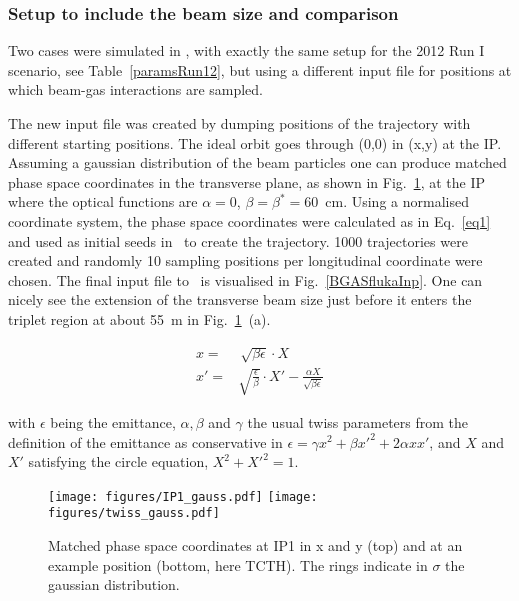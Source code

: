 \subsubsection{Setup to include the beam size and comparison \label{beamgasBS}}
Two cases were simulated in \fluka, with exactly the same setup for the 2012 Run I scenario, see Table~\ref{paramsRun12}, but using a different input file for positions at which beam-gas interactions are sampled.

The new input file was created by dumping positions of the trajectory with different starting positions. The ideal orbit goes through (0,0) in (x,y) at the IP. Assuming a gaussian distribution of the beam particles one can produce matched phase space coordinates in the transverse plane, as shown in Fig.~\ref{ip1_gauss}, at the IP where the optical functions are $\alpha = 0$, $\beta = \beta^* = 60$~cm. Using a normalised coordinate system, the phase space coordinates were calculated as in Eq.~\ref{eq1} and used as initial seeds in \fluka~to create the trajectory. 1000 trajectories were created and randomly 10 sampling positions per longitudinal coordinate were chosen. The final input file to \fluka~is visualised in Fig.~\ref{BGASflukaInp}. One can nicely see the extension of the transverse beam size just before it enters the triplet region at about 55~m in Fig.~\ref{ip1_gauss}~(a). 

\begin{equation} \label{eq1}
  \begin{split}
x = & \, \sqrt{\beta \epsilon} \cdot X \\
x' = & \sqrt{\frac{\epsilon}{\beta}} \cdot X' - \frac{\alpha X}{\sqrt{\beta \epsilon}}
  \end{split}
\end{equation}

with $\epsilon$ being the emittance, $\alpha, \beta$ and $\gamma$ the usual twiss parameters from the definition of the emittance as conservative in $\epsilon = \gamma x^2 + \beta x'^2 + 2 \alpha x x'$, and $X$ and $X'$ satisfying the circle equation, $X^2 + X'^2 = 1$. 


\begin{figure}%
\begin{center}
\texttt{[image: figures/IP1\_gauss.pdf]}
\texttt{[image: figures/twiss\_gauss.pdf]}
\end{center}
\vspace{-0.6cm}
 \caption{Matched phase space coordinates at IP1 in x and y (top) and at an example position (bottom, here TCTH). The rings indicate in $\sigma$ the gaussian distribution.
  \label{ip1_gauss}}
\end{figure}


